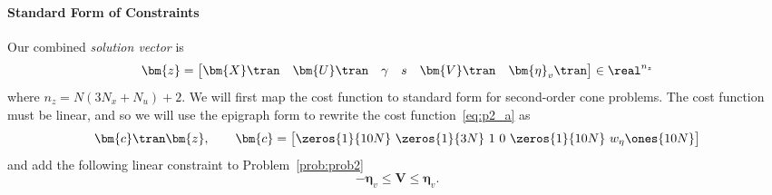 \documentclass[10pt]{article}
\begin{document}
\paragraph{Standard Form of Constraints}

Our combined \textit{solution vector} is 
\begin{equation*}
\bm{z} = \begin{bmatrix}
\bm{X}\tran & \bm{U}\tran & \gamma & s & \bm{V}\tran & \bm{\eta}_v\tran
\end{bmatrix} \in \real^{n_z}
\end{equation*}
where $n_z = N(3N_x + N_u)+2$. We will first map the cost function to standard form for second-order cone problems. The cost function must be linear, and so we will use the epigraph form to rewrite the cost function~\eqref{eq:p2_a} as
\begin{equation}
\bm{c}\tran \bm{z}, \qquad \bm{c} = \big[ \zeros{1}{10N} \ \zeros{1}{3N} \ 1 \ 0 \ \zeros{1}{10N} \ w_{\eta} \ones{10N} \big]
\label{eq:std_cost}
\end{equation}
and add the following linear constraint to Problem~\ref{prob:prob2}
\begin{equation}
- \bm{\eta}_v \leq \bm{V} \leq \bm{\eta}_v.
\label{eq:p2_epi}
\end{equation}
\end{document}
